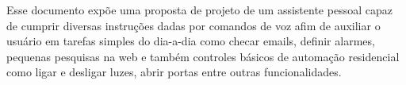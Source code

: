 Esse documento expõe uma proposta de projeto de um assistente pessoal capaz de cumprir diversas instruções dadas por comandos de voz afim de auxiliar o usuário em tarefas simples do dia-a-dia como checar emails, definir alarmes, pequenas pesquisas na web e também controles básicos de automação residencial como ligar e desligar luzes, abrir portas entre outras funcionalidades.
